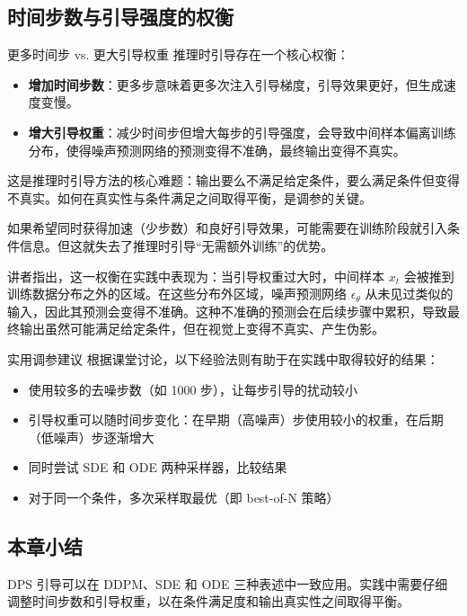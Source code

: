\subsection{时间步数与引导强度的权衡}

\begin{warningbox}{更多时间步 vs. 更大引导权重}
推理时引导存在一个核心权衡：
\begin{itemize}
    \item \textbf{增加时间步数}：更多步意味着更多次注入引导梯度，引导效果更好，但生成速度变慢。
    \item \textbf{增大引导权重}：减少时间步但增大每步的引导强度，会导致中间样本偏离训练分布，使得噪声预测网络的预测变得不准确，最终输出变得不真实。
\end{itemize}
这是推理时引导方法的核心难题：输出要么不满足给定条件，要么满足条件但变得不真实。如何在真实性与条件满足之间取得平衡，是调参的关键。
\end{warningbox}

如果希望同时获得加速（少步数）和良好引导效果，可能需要在训练阶段就引入条件信息。但这就失去了推理时引导``无需额外训练''的优势。

讲者指出，这一权衡在实践中表现为：当引导权重过大时，中间样本 $x_t$ 会被推到训练数据分布之外的区域。在这些分布外区域，噪声预测网络 $\epsilon_\theta$ 从未见过类似的输入，因此其预测会变得不准确。这种不准确的预测会在后续步骤中累积，导致最终输出虽然可能满足给定条件，但在视觉上变得不真实、产生伪影。

\begin{knowledgebox}{实用调参建议}
根据课堂讨论，以下经验法则有助于在实践中取得较好的结果：
\begin{itemize}
    \item 使用较多的去噪步数（如 1000 步），让每步引导的扰动较小
    \item 引导权重可以随时间步变化：在早期（高噪声）步使用较小的权重，在后期（低噪声）步逐渐增大
    \item 同时尝试 SDE 和 ODE 两种采样器，比较结果
    \item 对于同一个条件，多次采样取最优（即 best-of-N 策略）
\end{itemize}
\end{knowledgebox}

\subsection{本章小结}

DPS 引导可以在 DDPM、SDE 和 ODE 三种表述中一致应用。实践中需要仔细调整时间步数和引导权重，以在条件满足度和输出真实性之间取得平衡。

